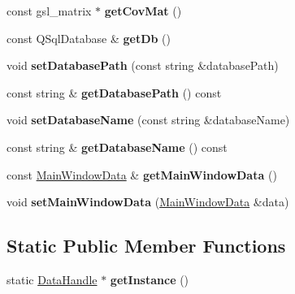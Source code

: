 \begin{DoxyCompactItemize}
\item 
\hypertarget{classDataHandle_adc2ab1469d9c9e68779de939945de545}{const gsl\-\_\-matrix $\ast$ {\bfseries get\-Cov\-Mat} ()}\label{classDataHandle_adc2ab1469d9c9e68779de939945de545}

\item 
\hypertarget{classDataHandle_a5693f364f55b8ca38485be73bb186b60}{const Q\-Sql\-Database \& {\bfseries get\-Db} ()}\label{classDataHandle_a5693f364f55b8ca38485be73bb186b60}

\item 
\hypertarget{classDataHandle_a845b2bb0537fb34e4ad037beb453e36b}{void {\bfseries set\-Database\-Path} (const string \&database\-Path)}\label{classDataHandle_a845b2bb0537fb34e4ad037beb453e36b}

\item 
\hypertarget{classDataHandle_a0a6efa3f5bc4f09a72299135e91b7c36}{const string \& {\bfseries get\-Database\-Path} () const }\label{classDataHandle_a0a6efa3f5bc4f09a72299135e91b7c36}

\item 
\hypertarget{classDataHandle_a302e1fc204cb37b5bb5ad339e8366160}{void {\bfseries set\-Database\-Name} (const string \&database\-Name)}\label{classDataHandle_a302e1fc204cb37b5bb5ad339e8366160}

\item 
\hypertarget{classDataHandle_aea4035af37d6f02460fcabd3667738f9}{const string \& {\bfseries get\-Database\-Name} () const }\label{classDataHandle_aea4035af37d6f02460fcabd3667738f9}

\item 
\hypertarget{classDataHandle_a138330c0f643216df97c21ba9a66f39d}{const \hyperlink{structMainWindowData}{Main\-Window\-Data} \& {\bfseries get\-Main\-Window\-Data} ()}\label{classDataHandle_a138330c0f643216df97c21ba9a66f39d}

\item 
\hypertarget{classDataHandle_a969c18ae3f2bc8782ab02959a244e965}{void {\bfseries set\-Main\-Window\-Data} (\hyperlink{structMainWindowData}{Main\-Window\-Data} \&data)}\label{classDataHandle_a969c18ae3f2bc8782ab02959a244e965}

\end{DoxyCompactItemize}
\subsection*{Static Public Member Functions}
\begin{DoxyCompactItemize}
\item 
\hypertarget{classDataHandle_ace9a04d469e246e810d0953801eed10c}{static \hyperlink{classDataHandle}{Data\-Handle} $\ast$ {\bfseries get\-Instance} ()}\label{classDataHandle_ace9a04d469e246e810d0953801eed10c}

\end{DoxyCompactItemize}
